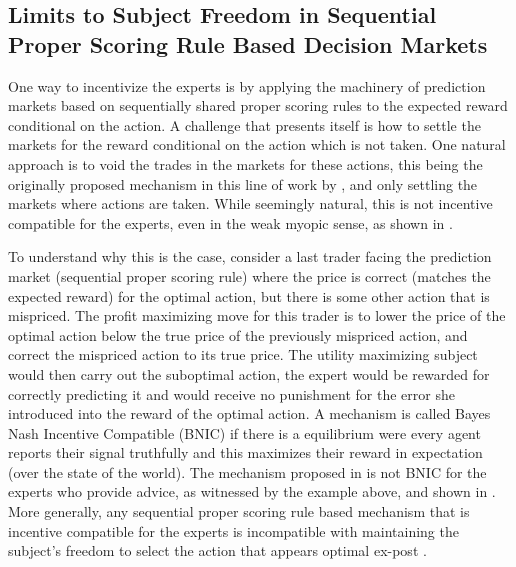 


\subsection{Limits to Subject Freedom in Sequential Proper Scoring Rule Based Decision Markets}

One way to incentivize the experts is by applying the machinery of prediction markets based on sequentially shared proper scoring rules to the expected reward conditional on the action.
A challenge that presents itself is how to settle the markets for the reward conditional on the action which is not taken.
One natural approach is to void the trades in the markets for these actions, this being the originally proposed mechanism in this line of work by \citet{hanson2002decision}, and only settling the markets where actions are taken.
While seemingly natural, this is not incentive compatible for the experts, even in the weak myopic sense, as shown in \citet{othman2010decision}. 

To understand why this is the case, consider a last trader facing the prediction market (sequential proper scoring rule)  where the  price is correct (matches the expected reward) for the optimal action, but there is some other action that is mispriced. The profit maximizing move for this trader is to lower the price of the optimal action below the true price of the previously mispriced action, and correct the mispriced action to its true  price. 
The utility maximizing subject would then carry out the suboptimal action, the expert would be rewarded for correctly predicting it and would receive no punishment for the error she introduced into the reward of the optimal action. 
A mechanism is called Bayes Nash Incentive Compatible (BNIC) if there is a equilibrium were every agent reports their signal truthfully and this maximizes their reward in expectation (over the state of the world).
The mechanism proposed in \citep{hanson2002decision} is not BNIC for the experts who provide advice, as witnessed by the example above, and shown in \citep{othman2010decision,chen2014eliciting}.
More generally, any sequential proper scoring rule based mechanism that is incentive compatible for the experts is incompatible with maintaining the subject's freedom to select the action that appears optimal ex-post \citep{ chen2014eliciting}. 

